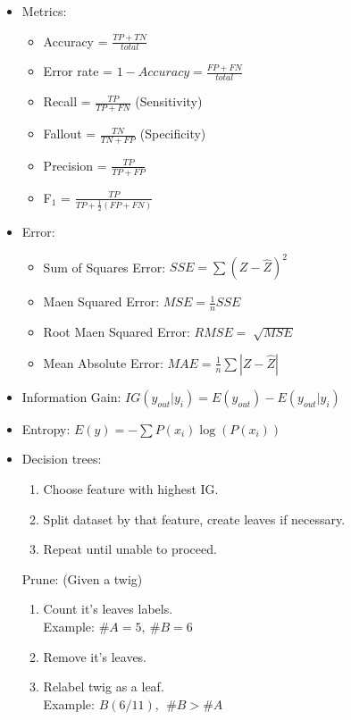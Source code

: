 \documentclass[twocolumn, 10pt]{article}
\begin{document}
\begin{itemize}[leftmargin=*, itemsep=0pt]
    \item Metrics:
    \begin{itemize}[topsep=0pt, itemsep=0pt]
        \item Accuracy = $\displaystyle \frac{TP+TN}{total}$
        \item Error rate = $\displaystyle 1-Accuracy=\frac{FP+FN}{total}$
        \item Recall = $\displaystyle \frac{TP}{TP+FN}$ (Sensitivity)
        \item Fallout = $\displaystyle \frac{TN}{TN+FP}$ (Specificity)
        \item Precision = $\displaystyle \frac{TP}{TP+FP}$
        \item F$_1$ = $\displaystyle \frac{TP}{TP+\frac{1}{2}(FP+FN)}$
    \end{itemize}

    \item Error:
    \begin{itemize}[topsep=0pt, itemsep=0pt]
        \item Sum of Squares Error: $SSE=\sum(Z-\hat{Z})^2$
        \item Maen Squared Error: $MSE=\frac{1}{n}SSE$
        \item Root Maen Squared Error: $RMSE=\sqrt[]{MSE}$
        \item Mean Absolute Error: $MAE=\frac{1}{n}\sum|Z-\hat{Z}|$
    \end{itemize}

    \item Information Gain: $IG(y_{out}|y_{i})=E(y_{out})-E(y_{out}|y_{i})$

    \item Entropy: $E(y)=-\sum P(x_i) \log(P(x_i))$

    \item Decision trees:
    \begin{enumerate}[topsep=0pt, itemsep=0pt]
        \item Choose feature with highest IG.
        \item Split dataset by that feature, create leaves if necessary.
        \item Repeat until unable to proceed.
    \end{enumerate}
    Prune: (Given a twig)
    \begin{enumerate}[topsep=0pt, itemsep=0pt]
        \item Count it's leaves labels. \\ Example: $\#A=5, \ \#B=6$
        \item Remove it's leaves.
        \item Relabel twig as a leaf. \\ Example: $B(6/11), \ \ \#B>\#A$ 
    \end{enumerate}


\end{itemize}
\end{document}
